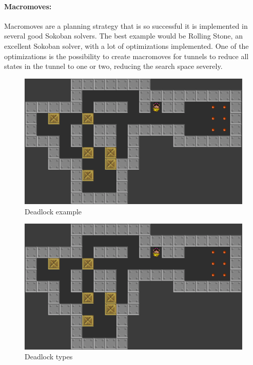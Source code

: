 \documentclass{report}
\begin{document}
\paragraph{Macromoves:} Macromoves are a planning strategy that is so successful it is implemented in several good Sokoban solvers. The best example would be Rolling Stone, an excellent Sokoban solver, with a lot of optimizations implemented. One of the optimizations is the possibility to create macromoves for tunnels to reduce all states in the tunnel to one or two, reducing the search space severely.
\begin{figure}[ht]
\centering
\includegraphics[scale=0.2]{flipped,deadlockexample}
\caption{Deadlock example}
\label{fig:2}
\end{figure}
\begin{figure}[ht]
\centering
\includegraphics[scale=0.2]{deadlocktypes}
\caption{Deadlock types}
\label{fig:3}
\end{figure}
\end{document}
